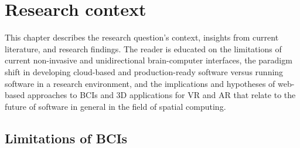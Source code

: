 \chapter{Research context}
\graphicspath{{Chapter2/Figs/}{Chapter2/Figs/}}

This chapter describes the research question's context, insights from current literature, and research findings. The reader is educated on the limitations of current non-invasive and unidirectional brain-computer interfaces, the paradigm shift in developing cloud-based and production-ready software versus running software in a research environment, and the implications and hypotheses of web-based approaches to BCIs and 3D applications for VR and AR that relate to the future of software in general in the field of spatial computing.

\section{Limitations of BCIs}
\label{chapter2-limitations-of-bcis}













